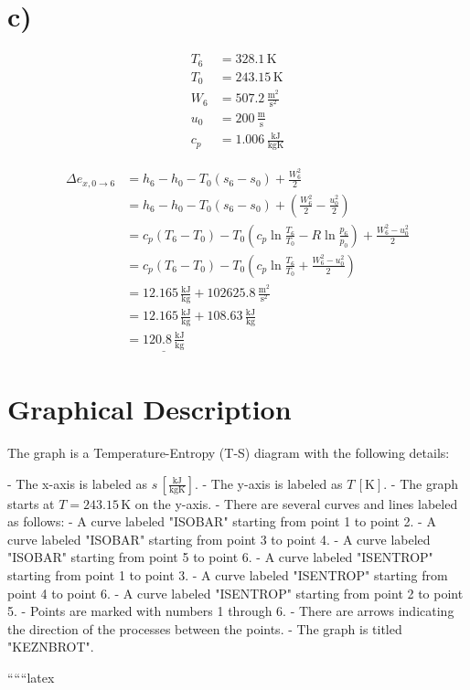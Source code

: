 

\section*{c)}

\begin{align*}
    T_6 &= 328.1 \, \text{K} \\
    T_0 &= 243.15 \, \text{K} \\
    W_6 &= 507.2 \, \frac{\text{m}^2}{\text{s}^2} \\
    u_0 &= 200 \, \frac{\text{m}}{\text{s}} \\
    c_p &= 1.006 \, \frac{\text{kJ}}{\text{kgK}}
\end{align*}

\begin{align*}
    \Delta e_{x, 0 \to 6} &= h_6 - h_0 - T_0 (s_6 - s_0) + \frac{W_6^2}{2} \\
    &= h_6 - h_0 - T_0 (s_6 - s_0) + \left( \frac{W_6^2}{2} - \frac{u_0^2}{2} \right) \\
    &= c_p (T_6 - T_0) - T_0 \left( c_p \ln \frac{T_6}{T_0} - R \ln \frac{p_6}{p_0} \right) + \frac{W_6^2 - u_0^2}{2} \\
    &= c_p (T_6 - T_0) - T_0 \left( c_p \ln \frac{T_6}{T_0} + \frac{W_6^2 - u_0^2}{2} \right) \\
    &= 12.165 \, \frac{\text{kJ}}{\text{kg}} + 102625.8 \, \frac{\text{m}^2}{\text{s}^2} \\
    &= 12.165 \, \frac{\text{kJ}}{\text{kg}} + 108.63 \, \frac{\text{kJ}}{\text{kg}} \\
    &= \underline{120.8 \, \frac{\text{kJ}}{\text{kg}}}
\end{align*}

\section*{Graphical Description}

The graph is a Temperature-Entropy (T-S) diagram with the following details:

- The x-axis is labeled as $s \, \left[ \frac{\text{kJ}}{\text{kgK}} \right]$.
- The y-axis is labeled as $T \, [\text{K}]$.
- The graph starts at $T = 243.15 \, \text{K}$ on the y-axis.
- There are several curves and lines labeled as follows:
  - A curve labeled "ISOBAR" starting from point 1 to point 2.
  - A curve labeled "ISOBAR" starting from point 3 to point 4.
  - A curve labeled "ISOBAR" starting from point 5 to point 6.
  - A curve labeled "ISENTROP" starting from point 1 to point 3.
  - A curve labeled "ISENTROP" starting from point 4 to point 6.
  - A curve labeled "ISENTROP" starting from point 2 to point 5.
- Points are marked with numbers 1 through 6.
- There are arrows indicating the direction of the processes between the points.
- The graph is titled "KEZNBROT".

``````latex